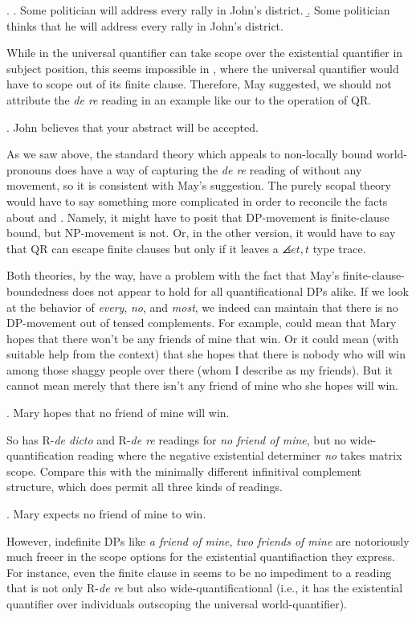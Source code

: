\ex. \a. Some politician will address every rally in John's district. 
\b. Some politician thinks that he will address every rally in John's district.

While in \Last[a] the universal quantifier can take scope over the existential quantifier in subject position, this seems impossible in \Last[b], where the universal quantifier would have to scope out of its finite clause. Therefore, May suggested, we should not attribute the \emph{de re} reading in an example like our \Next to the operation of QR.

\ex. John believes that your abstract will be accepted.

As we saw above, the standard theory which appeals to non-locally bound world-pronouns does have a way of capturing the \emph{de re} reading of \Last without any movement, so it is consistent with May's suggestion. The purely scopal theory would have to say something more complicated in order to reconcile the facts about \LLast and \Last. Namely, it might have to posit that DP-movement is finite-clause bound, but NP-movement is not. Or, in the other version, it would have to say that QR can escape finite clauses but only if it leaves a $\angles{et,t}$ type trace.

Both theories, by the way, have a problem with the fact that May's finite-clause-boundedness does not appear to hold for all quantificational DPs alike. If we look at the behavior of \emph{every}, \emph{no}, and \emph{most}, we indeed can maintain that there is no DP-movement out of tensed complements. For example, \Next could mean that Mary hopes that there won't be any friends of mine that win. Or it could mean (with suitable help from the context) that she hopes that there is nobody who will win among those shaggy people over there (whom I describe as my friends). But it cannot mean merely that there isn't any friend of mine who she hopes will win.

\ex. Mary hopes that no friend of mine will win.

So \Next has R-\emph{de dicto} and R-\emph{de re} readings for \emph{no friend of mine}, but no wide-quantification reading where the negative existential determiner \emph{no} takes matrix scope. Compare this with the minimally different infinitival complement structure, which does permit all three kinds of readings.

\ex. Mary expects no friend of mine to win.

However, indefinite DPs like \emph{a friend of mine}, \emph{two friends of mine} are notoriously much freeer in the scope options for the existential quantifiaction they express. For instance, even the finite clause in \Next seems to be no impediment to a reading that is not only R-\emph{de re} but also wide-quantificational (i.e., it has the existential quantifier over individuals outscoping the universal world-quantifier).

